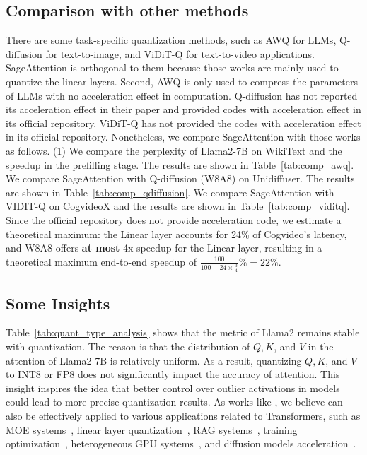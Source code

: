 \subsection{Comparison with other methods}

There are some task-specific quantization methods, such as AWQ for LLMs, Q-diffusion for text-to-image, and ViDiT-Q for text-to-video applications. 
SageAttention is orthogonal to them because those works are mainly used to quantize the linear layers. Second, AWQ is only used to compress the parameters of LLMs with no acceleration effect in computation. Q-diffusion has not reported its acceleration effect in their paper and provided codes with acceleration effect in its official repository. ViDiT-Q has not provided the codes with acceleration effect in its official repository. Nonetheless, we compare SageAttention with those works as follows.
(1) We compare the perplexity of Llama2-7B on WikiText and the speedup in the prefilling stage. The results are shown in Table~\ref{tab:comp_awq}.
We compare SageAttention with Q-diffusion (W8A8) on Unidiffuser. The results are shown in Table~\ref{tab:comp_qdiffusion}.
We compare SageAttention with VIDIT-Q on CogvideoX and the results are shown in Table~\ref{tab:comp_viditq}. Since the official repository does not provide acceleration code, we estimate a theoretical maximum: the Linear layer accounts for 24\% of Cogvideo's latency, and W8A8 offers \textbf{at most} 4x speedup for the Linear layer, resulting in a theoretical maximum end-to-end speedup of $\frac{100}{100 - 24 \times \frac{3}{4}}\% = 22\%$.




\subsection{Some Insights}
Table~\ref{tab:quant_type_analysis} shows that the metric of Llama2 remains stable with quantization. The reason is that the distribution of $Q, K$, and $V$ in the attention of Llama2-7B is relatively uniform. As a result, quantizing $Q, K$, and $V$ to INT8 or FP8 does not significantly impact the accuracy of attention. This insight inspires the idea that better control over outlier activations in models could lead to more precise quantization results.
As works like \citet{fu2024moa,zhang2024sageattention2,zhang2025sageattention2_wksp}, we believe \our can also be effectively applied to various applications related to Transformers, such as MOE systems~\citep{wang2024remoe}, linear layer quantization~\citep{hu2025quant,zhang2025int8train,zhao2024vidit}, RAG systems~\citep{sagerag}, training optimization~\citep{li2023memory,li2025optimization,huang2024pruninglargelanguagemodels,xi2024coat}, heterogeneous GPU systems~\citep{jiang2025demystifying,jianghexgen,jianghexgen2}, and diffusion models acceleration~\citep{zheng2024masked,zheng2024diffusion,zheng2025elucidating,fu2024framefusion,zhao2024mixdq,xi2025sparse,zhang2025spargeattn,zhang2025spargeattn_wksp,yang2025sparse,zhang2025sageattention3,zhang2025sageattention2++}.


